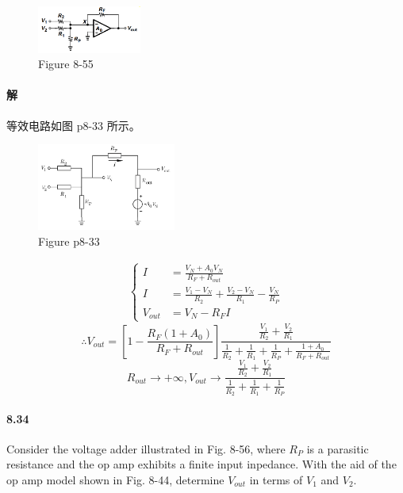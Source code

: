 \documentclass[hyperref, UTF8]{ctexart}
\newcommand{\under}[1]{\frac{1}{#1}}
\begin{document}
    \begin{figure}[!htb]
        \centering
        \includegraphics[width=0.305\textwidth]{p8-55.png}
        \caption*{Figure 8-55}
    \end{figure}
        
\paragraph{解}
    等效电路如图 p8-33 所示。

    \begin{figure}[!htb]
        \centering
        \includegraphics[width=0.405\textwidth]{p8-33-sol.png}
        \caption*{Figure p8-33}
    \end{figure}
        
    \begin{gather*}\left\{\begin{aligned}
        I & = \frac{V_N + A_0 V_N}{R_F + R_{out}} \\
        I & = \frac{V_1 - V_N}{R_2} + \frac{V_2-V_N}{R_1} - \frac{V_N}{R_P} \\
        V_{out} & = V_N - R_F I
    \end{aligned}\right.\end{gather*}
    $$\therefore V_{out} = \left[1-\frac{R_F(1+A_0)}{R_F+R_{out}}\right]\frac{\frac{V_1}{R_2} + \frac{V_2}{R_1}}{\under{R_2} + \under{R_1} + \under{R_P} + \frac{1+A_0}{R_F + R_{out}}}$$
    $$R_{out} \rightarrow +\infty, V_{out} \rightarrow \frac{\frac{V_1}{R_2} + \frac{V_2}{R_1}}{\under{R_2} + \under{R_1} + \under{R_P}}$$

\paragraph{8.34} \label{8.34}
    Consider the voltage adder illustrated in Fig. 8-56, where $R_P$ is a parasitic resistance and the op amp exhibits a finite input inpedance. With the aid of the op amp model shown in Fig. 8-44, determine $V_{out}$ in terms of $V_1$ and $V_2$.
\end{document}
